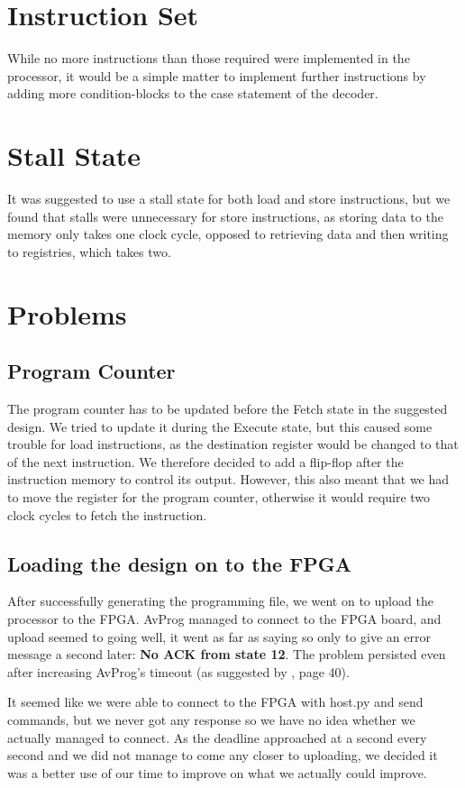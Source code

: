 \section{Instruction Set}

While no more instructions than those required were implemented in the processor, it would be a simple matter to implement further instructions by adding more condition-blocks to the case statement of the decoder.

\section{Stall State}

It was suggested to use a stall state for both load and store instructions, but we found that stalls were unnecessary for store instructions, as storing data to the memory only takes one clock cycle, opposed to retrieving data and then writing to registries, which takes two.

\section{Problems}

\subsection{Program Counter}

The program counter has to be updated before the Fetch state in the suggested design. We tried to update it during the Execute state, but this caused some trouble for load instructions, as the destination register would be changed to that of the next instruction. We therefore decided to add a flip-flop after the instruction memory to control its output. However, this also meant that we had to move the register for the program counter, otherwise it would require two clock cycles to fetch the instruction.

\subsection{Loading the design on to the FPGA}
\label{subsec:uploadproblems}

After successfully generating the programming file, we went on to upload the processor to the FPGA.
AvProg managed to connect to the FPGA board, and upload seemed to going well, it went as far as saying so only to give an error message a second later: \textbf{No ACK from state 12}.
The problem persisted even after increasing AvProg's timeout (as suggested by \cite{avnet-programming-user-manual}, page 40).

It seemed like we were able to connect to the FPGA with host.py and send commands, but we never got any response so we have no idea whether we actually managed to connect.
As the deadline approached at a second every second and we did not manage to come any closer to uploading, we decided it was a better use of our time to improve on what we actually could improve.
